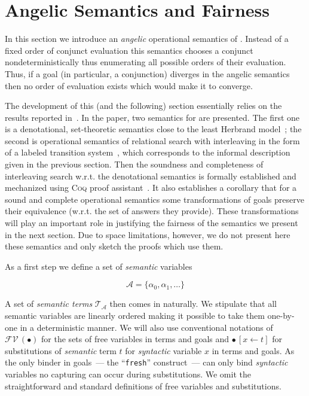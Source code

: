 \section{Angelic Semantics and Fairness}
\label{sec:angelic-semantics}

In this section we introduce an \emph{angelic} operational semantics of \mk. Instead of a fixed order of conjunct evaluation this semantics chooses a conjunct nondeterministically
thus enumerating all possible orders of their evaluation. Thus, if a goal (in particular, a conjunction) diverges in the angelic semantics then no order of evaluation exists which
would make it to converge.

The development of this (and the following) section essentially relies on the results reported in~\cite{fair:semantics}. In the paper, two semantics for \mk are presented. The first one is
a denotational, set-theoretic semantics close to the least Herbrand model~\cite{Lloyd}; the second is operational semantics of relational search with interleaving in the form of a labeled transition
system~\cite{LTS}, which corresponds to the informal description given in the previous section. Then the soundness and completeness of interleaving search w.r.t. the denotational semantics
is formally established and mechanized using \textsc{Coq} proof assistant~\cite{Coq}. It also establishes a corollary that for a sound and complete operational semantics some
transformations of goals preserve their equivalence (w.r.t. the set of answers they provide). These transformations will play an important role in justifying the fairness of the semantics we present
in the next section. Due to space limitations, however, we do not present here these semantics and only sketch the proofs which use them.
 
As a first step we define a set of \emph{semantic} variables

\[
\mathcal{A}=\{\alpha_0,\alpha_1,\dots\}
\]

A set of \emph{semantic terms} $\mathcal{T}_{\mathcal A}$ then comes in naturally. We stipulate that all semantic variables are linearly ordered making it possible to take them one-by-one
in a deterministic manner. We will also use conventional notations of $\mathcal{FV}\,(\bullet)$ for the sets of free variables in terms and goals and $\bullet\,[x\gets t]$ for substitutions
of \emph{semantic} term $t$ for \emph{syntactic} variable $x$ in terms and goals. As the only binder in goals~--- the ``\lstinline|fresh|'' construct~--- can only bind \emph{syntactic}
variables no capturing can occur during substitutions. We omit the straightforward and standard definitions of free variables and substitutions.

